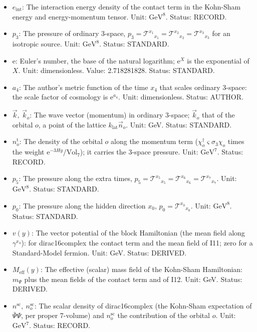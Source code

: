 \documentclass[
  10pt,
]{article}
\begin{document}
\begin{itemize}
  of eight dimensions); \(n_f\) the density of the fermion component
  \(f\) and \(n_i\) that of the neutrino mass state \(i\) (per 3-volume
  of four dimensions). Unit: \(\mathrm{GeV}^{7}\) (eight dimensions),
  \(\mathrm{GeV}^{3}\) (four dimensions). Status: STANDARD.
\item
  \(e_{\mathrm{int}}\): The interaction energy density of the contact
  term in the Kohn-Sham energy and energy-momentum tensor. Unit:
  \(\mathrm{GeV}^{8}\). Status: RECORD.
\item
  \(p_3\): The pressure of ordinary 3-space,
  \(p_3 = \mathcal{T}^{x_1}{}_{x_1} = \mathcal{T}^{x_2}{}_{x_2} = \mathcal{T}^{x_3}{}_{x_3}\)
  for an isotropic source. Unit: \(\mathrm{GeV}^{8}\). Status: STANDARD.
\item
  \(\mathrm{e}\): Euler's number, the base of the natural logarithm;
  \(\mathrm{e}^{X}\) is the exponential of \(X\). Unit: dimensionless.
  Value: 2.718281828. Status: STANDARD.
\item
  \(a_4\): The author's metric function of the time \(x_4\) that scales
  ordinary 3-space: the scale factor of cosmology is
  \(\mathrm{e}^{a_4}\). Unit: dimensionless. Status: AUTHOR.
\item
  \(\vec k,\ \vec k_o\): The wave vector (momentum) in ordinary 3-space;
  \(\vec k_o\) that of the orbital \(o\), a point of the lattice
  \(k_{\mathrm{lat}}\vec n_o\). Unit: GeV. Status: STANDARD.
\item
  \(n^{\mathrm{t}}_o\): The density of the orbital \(o\) along the
  momentum term (\(\chi_o^\dagger\varsigma\sigma_3\chi_o\) times the
  weight \(\mathrm{e}^{-3Hy}/\mathrm{Vol}_7\)); it carries the 3-space
  pressure. Unit: \(\mathrm{GeV}^{7}\). Status: RECORD.
\item
  \(p_5\): The pressure along the extra times,
  \(p_5 = \mathcal{T}^{x_5}{}_{x_5} = \mathcal{T}^{x_6}{}_{x_6} = \mathcal{T}^{x_7}{}_{x_7}\).
  Unit: \(\mathrm{GeV}^{8}\). Status: STANDARD.
\item
  \(p_0\): The pressure along the hidden direction \(x_0\),
  \(p_0 = \mathcal{T}^{x_0}{}_{x_0}\). Unit: \(\mathrm{GeV}^{8}\).
  Status: STANDARD.
\item
  \(v(y)\): The vector potential of the block Hamiltonian (the mean
  field along \(\gamma^{x_4}\)): for dirac16complex the contact term and
  the mean field of I11; zero for a Standard-Model fermion. Unit: GeV.
  Status: DERIVED.
\item
  \(M_{\mathrm{eff}}(y)\): The effective (scalar) mass field of the
  Kohn-Sham Hamiltonian: \(m_\Psi\) plus the mean fields of the contact
  term and of I12. Unit: GeV. Status: DERIVED.
\item
  \(n^{\mathrm{sc}},\ n^{\mathrm{sc}}_o\): The scalar density of
  dirac16complex (the Kohn-Sham expectation of \(\bar\Psi\Psi\), per
  proper 7-volume) and \(n^{\mathrm{sc}}_o\) the contribution of the
  orbital \(o\). Unit: \(\mathrm{GeV}^{7}\). Status: RECORD.
\end{itemize}
\end{document}
